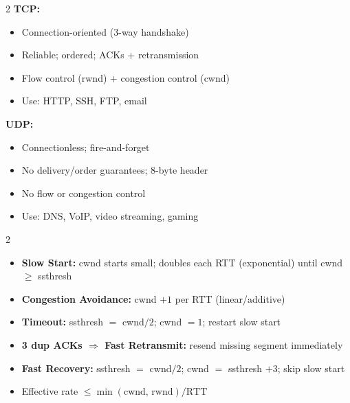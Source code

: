 \documentclass[11pt, letterpaper]{article}
\begin{document}
\vspace{4pt}

\begin{tcolorbox}[colback=part2bg, colframe=sectiongreen,
  title={\bfseries TCP vs.\ UDP}, arc=3pt, boxrule=1pt]
\footnotesize
\begin{multicols}{2}
\textbf{TCP:}
\begin{itemize}[noitemsep, leftmargin=*]
  \item Connection-oriented (3-way handshake)
  \item Reliable; ordered; ACKs + retransmission
  \item Flow control (rwnd) + congestion control (cwnd)
  \item Use: HTTP, SSH, FTP, email
\end{itemize}
\columnbreak
\textbf{UDP:}
\begin{itemize}[noitemsep, leftmargin=*]
  \item Connectionless; fire-and-forget
  \item No delivery/order guarantees; 8-byte header
  \item No flow or congestion control
  \item Use: DNS, VoIP, video streaming, gaming
\end{itemize}
\end{multicols}
\end{tcolorbox}

\vspace{4pt}

\begin{tcolorbox}[colback=part4bg, colframe=sectionorange,
  title={\bfseries TCP Congestion Control (Reno)}, arc=3pt, boxrule=1pt]
\footnotesize
\begin{multicols}{2}
\begin{itemize}[noitemsep, leftmargin=*]
  \item \textbf{Slow Start:} cwnd starts small; doubles each RTT (exponential) until cwnd $\geq$ ssthresh
  \item \textbf{Congestion Avoidance:} cwnd $+1$ per RTT (linear/additive)
  \item \textbf{Timeout:} ssthresh $=$ cwnd$/2$; cwnd $= 1$; restart slow start
\end{itemize}
\columnbreak
\begin{itemize}[noitemsep, leftmargin=*]
  \item \textbf{3 dup ACKs $\Rightarrow$ Fast Retransmit:} resend missing segment immediately
  \item \textbf{Fast Recovery:} ssthresh $=$ cwnd$/2$; cwnd $=$ ssthresh $+ 3$; skip slow start
  \item Effective rate $\leq \min(\text{cwnd, rwnd}) / \text{RTT}$
\end{itemize}
\end{multicols}
\end{tcolorbox}
\end{document}
